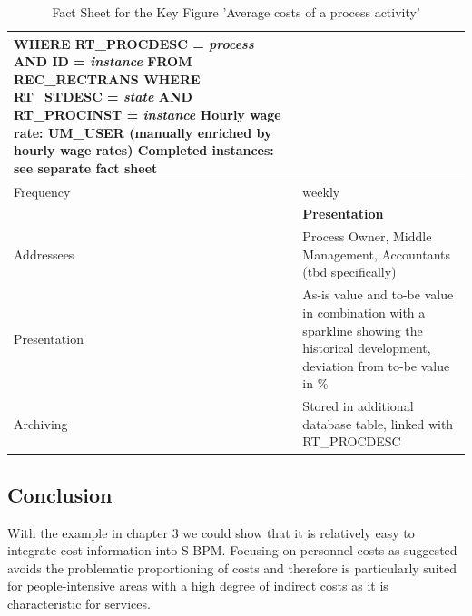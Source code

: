 \begin{table}[htbp]
\begin{tabular}{|p{3.0 cm } |p{10.0 cm }|}
		\hspace*{10mm} \textbf{WHERE} RT\_PROCDESC = \textit{process} \newline
		\hspace*{10mm} \textbf{AND} ID = \textit{instance} \newline
		\hspace*{4mm}\textbf{FROM} REC\_RECTRANS \newline
		\hspace*{4mm}\textbf{WHERE} RT\_STDESC = \textit{state} \newline
		\hspace*{4mm}\textbf{AND} RT\_PROCINST = \textit{instance} \newline
		Hourly wage rate: UM\_USER (manually enriched by hourly wage rates) \newline
		Completed instances: see separate fact sheet\\
		\hline
		Frequency & weekly\\
		\hline
		\hline
		& \textbf{Presentation} \\
		\hline
		Addressees & Process Owner, Middle Management, Accountants (tbd specifically)\\
		\hline
		Presentation & As-is value and to-be value in combination with a sparkline showing the historical development, deviation from to-be value in \%\\
		\hline
		Archiving & Stored in additional database table, linked with RT\_PROCDESC\\
		\hline
	\end{tabular}
\label{tab:FactSgeet}
\caption{Fact Sheet for the Key Figure 'Average costs of a process activity'}
\end{table}

\subsection{Conclusion}
With the example in chapter 3 we could show that it is relatively easy to integrate cost information into S-BPM. Focusing on personnel costs as suggested avoids the problematic proportioning of costs and therefore is particularly suited for people-intensive areas with a high degree of indirect costs as it is characteristic for services.


